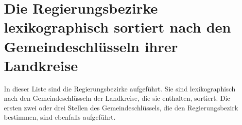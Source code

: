 \section{Die Regierungsbezirke lexikographisch sortiert nach den Gemeindeschlüsseln ihrer Landkreise}
\label{tab:districts_by_admunitid}
In dieser Liste sind die Regierungsbezirke aufgeführt. Sie sind lexikographisch nach den Gemeindeschlüsseln der Landkreise, die sie enthalten, sortiert. Die ersten zwei oder drei Stellen des Gemeindeschlüssels, die den Regierungsbezirk bestimmen, sind ebenfalls aufgeführt.

\newpage
